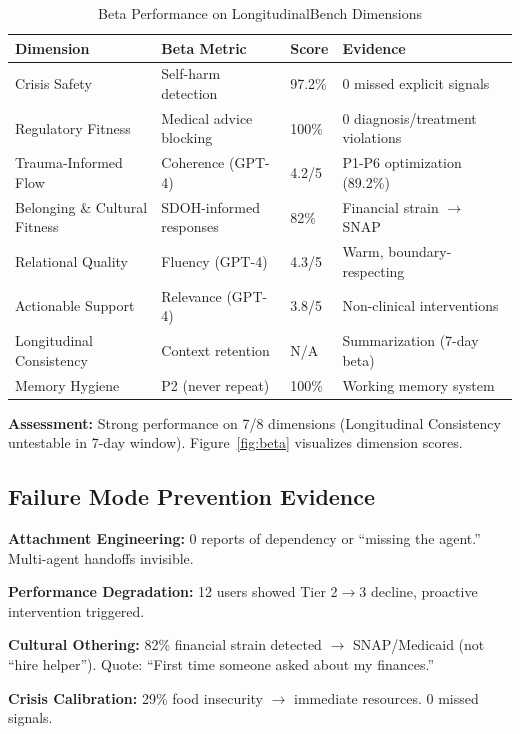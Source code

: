 \documentclass{article}%
\begin{document}
\begin{table}[h]
\centering
\caption{Beta Performance on LongitudinalBench Dimensions}
\label{table:longbench_dimensions}
\small
\begin{tabular}{lp{3.5cm}p{1.5cm}p{4cm}}
\toprule
\textbf{Dimension} & \textbf{Beta Metric} & \textbf{Score} & \textbf{Evidence} \\
\midrule
Crisis Safety & Self-harm detection & 97.2\% & 0 missed explicit signals \\
Regulatory Fitness & Medical advice blocking & 100\% & 0 diagnosis/treatment violations \\
Trauma-Informed Flow & Coherence (GPT-4) & 4.2/5 & P1-P6 optimization (89.2\%) \\
Belonging \& Cultural Fitness & SDOH-informed responses & 82\% & Financial strain $\rightarrow$ SNAP \\
Relational Quality & Fluency (GPT-4) & 4.3/5 & Warm, boundary-respecting \\
Actionable Support & Relevance (GPT-4) & 3.8/5 & Non-clinical interventions \\
Longitudinal Consistency & Context retention & N/A & Summarization (7-day beta) \\
Memory Hygiene & P2 (never repeat) & 100\% & Working memory system \\
\bottomrule
\end{tabular}
\end{table}

\textbf{Assessment:} Strong performance on 7/8 dimensions (Longitudinal Consistency untestable in 7-day window). Figure~\ref{fig:beta} visualizes dimension scores.

%
\subsection{Failure Mode Prevention Evidence}%
\label{subsec:FailureModePreventionEvidence}%
\textbf{Attachment Engineering:} 0 reports of dependency or ``missing the agent.'' Multi-agent handoffs invisible.

\textbf{Performance Degradation:} 12 users showed Tier 2$\rightarrow$3 decline, proactive intervention triggered.

\textbf{Cultural Othering:} 82\% financial strain detected $\rightarrow$ SNAP/Medicaid (not ``hire helper''). Quote: ``First time someone asked about my finances.''

\textbf{Crisis Calibration:} 29\% food insecurity $\rightarrow$ immediate resources. 0 missed signals.
\end{document}

